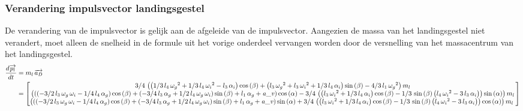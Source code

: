\subsubsection{Verandering impulsvector landingsgestel}
De verandering van de impulsvector is gelijk aan de afgeleide van de impulsvector. Aangezien de massa van het landingsgestel niet verandert, moet alleen de snelheid in de formule uit het vorige onderdeel vervangen worden door de versnelling van het massacentrum van het landingsgestel.
\begin{equation}
\begin{split}
\frac{d\overrightarrow{{p}_{l}}}{dt}
&=m_{l}\,\overrightarrow{{a}_{D}}\\
&=	  \begin{bmatrix}
      3/4\, \left(  \left( 1/3\,l_{4}\,{\omega_{g}
}^{2}+1/3\,l_{4}\,{\omega_{i}}^{2}-l_{3}\,\alpha_{i} \right) \cos
 \left( \beta \right) + \left( l_{3}\,{\omega_{g}}^{2}+l_{3}\,{\omega_
{i}}^{2}+1/3\,l_{4}\,\alpha_{i} \right) \sin \left( \beta \right) -4/3
\,l_{1}\,{\omega_{g}}^{2} \right) m_{l}\\ 
%
 \left( 
 \left(  \left( -3/2\,l_{3}\,\omega_{g}\,\omega_{i}-1/4\,l_{4}\,\alpha
_{g} \right) \cos \left( \beta \right) + \left( -3/4\,l_{3}\,\alpha_{g
}+1/2\,l_{4}\,\omega_{g}\,\omega_{i} \right) \sin \left( \beta
 \right) +l_{1}\,\alpha_{g}+{\it a\_v} \right) \cos \left( \alpha
 \right) -3/4\, \left(  \left( l_{3}\,{\omega_{i}}^{2}+1/3\,l_{4}\,
\alpha_{i} \right) \cos \left( \beta \right) -1/3\,\sin \left( \beta
 \right)  \left( l_{4}\,{\omega_{i}}^{2}-3\,l_{3}\,\alpha_{i} \right) 
 \right) \sin \left( \alpha \right)  \right) m_{l}
\\ 
%
 \left(  \left(  \left( -3/2\,l_{3}\,\omega_{g}\,
\omega_{i}-1/4\,l_{4}\,\alpha_{g} \right) \cos \left( \beta \right) +
 \left( -3/4\,l_{3}\,\alpha_{g}+1/2\,l_{4}\,\omega_{g}\,\omega_{i}
 \right) \sin \left( \beta \right) +l_{1}\,\alpha_{g}+{\it a\_v}
 \right) \sin \left( \alpha \right) +3/4\, \left(  \left( l_{3}\,{
\omega_{i}}^{2}+1/3\,l_{4}\,\alpha_{i} \right) \cos \left( \beta
 \right) -1/3\,\sin \left( \beta \right)  \left( l_{4}\,{\omega_{i}}^{
2}-3\,l_{3}\,\alpha_{i} \right)  \right) \cos \left( \alpha \right) 
 \right) m_{l}\
      \end{bmatrix}
\end{split}
\end{equation}

